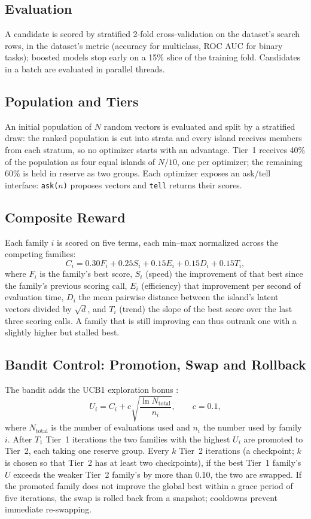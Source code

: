 \documentclass[conference]{IEEEtran}
\begin{document}
\subsection{Evaluation}
A candidate is scored by stratified 2-fold cross-validation on the dataset's search rows, in the dataset's metric (accuracy for multiclass, ROC AUC for binary tasks); boosted models stop early on a 15\% slice of the training fold. Candidates in a batch are evaluated in parallel threads.

\subsection{Population and Tiers}
An initial population of $N$ random vectors is evaluated and split by a stratified draw: the ranked population is cut into strata and every island receives members from each stratum, so no optimizer starts with an advantage. Tier~1 receives 40\% of the population as four equal islands of $N/10$, one per optimizer; the remaining 60\% is held in reserve as two groups. Each optimizer exposes an ask/tell interface: \texttt{ask($n$)} proposes vectors and \texttt{tell} returns their scores.

\subsection{Composite Reward}
Each family $i$ is scored on five terms, each min--max normalized across the competing families:
\begin{equation}
C_i = 0.30 F_i + 0.25 S_i + 0.15 E_i + 0.15 D_i + 0.15 T_i ,
\end{equation}
where $F_i$ is the family's best score, $S_i$ (speed) the improvement of that best since the family's previous scoring call, $E_i$ (efficiency) that improvement per second of evaluation time, $D_i$ the mean pairwise distance between the island's latent vectors divided by $\sqrt{d}$, and $T_i$ (trend) the slope of the best score over the last three scoring calls. A family that is still improving can thus outrank one with a slightly higher but stalled best.

\subsection{Bandit Control: Promotion, Swap and Rollback}
The bandit adds the UCB1 exploration bonus \cite{auer2002finite}:
\begin{equation}
U_i = C_i + c\sqrt{\frac{\ln N_{\mathrm{total}}}{n_i}}, \qquad c = 0.1,
\end{equation}
where $N_{\mathrm{total}}$ is the number of evaluations used and $n_i$ the number used by family $i$. After $T_1$ Tier~1 iterations the two families with the highest $U_i$ are promoted to Tier~2, each taking one reserve group. Every $k$ Tier~2 iterations (a checkpoint; $k$ is chosen so that Tier~2 has at least two checkpoints), if the best Tier~1 family's $U$ exceeds the weaker Tier~2 family's by more than 0.10, the two are swapped. If the promoted family does not improve the global best within a grace period of five iterations, the swap is rolled back from a snapshot; cooldowns prevent immediate re-swapping.
\end{document}
